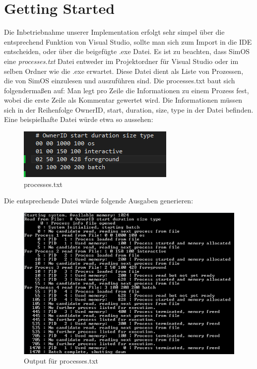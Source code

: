 \section{Getting Started}
Die Inbetriebnahme unserer Implementation erfolgt sehr simpel über die entsprechend Funktion von Visual Studio, sollte man sich zum Import in die IDE entscheiden, oder über die beigefügte .exe Datei.
Es ist zu beachten, dass SimOS eine \textit{processes.txt} Datei entweder im Projektordner für Visual Studio oder im selben Ordner wie die .exe erwartet. Diese Datei dient als Liste von Prozessen, die von SimOS einzulesen und auszuführen sind.
Die processes.txt baut sich folgendermaßen auf: Man legt pro Zeile die Informationen zu einem Prozess fest, wobei die erste Zeile als Kommentar gewertet wird. Die Informationen müssen sich in der Reihenfolge OwnerID, start, duration, size, type in der Datei befinden.
Eine beispielhafte Datei würde etwa so aussehen: \\
\begin{figure}[!h]
	\includegraphics[scale=1]{img/processes}
	\caption{processes.txt}
\end{figure}

Die entsprechende Datei würde folgende Ausgaben generieren:\\
\begin{figure}[!h]
	\includegraphics[scale=1]{img/output}
	\caption{Output für processes.txt}
\end{figure}
